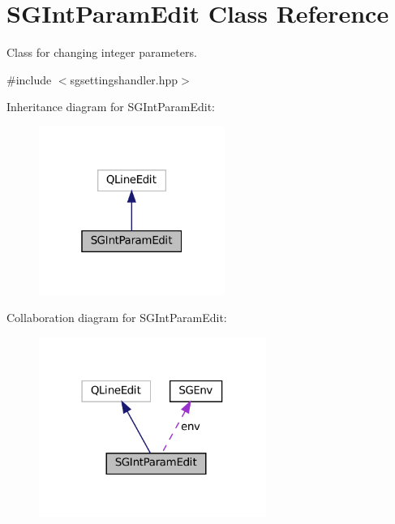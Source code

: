 \hypertarget{classSGIntParamEdit}{}\section{S\+G\+Int\+Param\+Edit Class Reference}
\label{classSGIntParamEdit}


Class for changing integer parameters.  




{\ttfamily \#include $<$sgsettingshandler.\+hpp$>$}



Inheritance diagram for S\+G\+Int\+Param\+Edit\+:
\nopagebreak
\begin{figure}[H]
\begin{center}
\leavevmode
\includegraphics[width=172pt]{classSGIntParamEdit__inherit__graph}
\end{center}
\end{figure}


Collaboration diagram for S\+G\+Int\+Param\+Edit\+:
\nopagebreak
\begin{figure}[H]
\begin{center}
\leavevmode
\includegraphics[width=210pt]{classSGIntParamEdit__coll__graph}
\end{center}
\end{figure}
